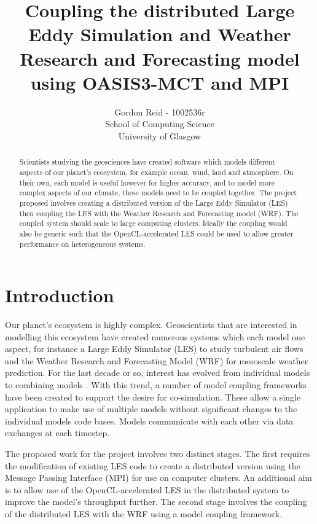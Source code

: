 \documentclass{acm_proc_article-sp}
\title{Coupling the distributed Large Eddy Simulation and Weather Research and
Forecasting model using OASIS3-MCT and MPI}
\author{Gordon Reid - 1002536r\\
        School of Computing Science\\
        University of Glasgow}
\begin{document}
\maketitle

\begin{abstract}

Scientists studying the geosciences have created software which models different
aspects of our planet's ecosystem, for example ocean, wind, land and atmosphere.
On their own, each model is useful however for higher accuracy, and to model
more complex aspects of our climate, these models need to be coupled together.
The project proposed involves creating a distributed version of the Large Eddy
Simulator (LES) then coupling the LES with the Weather Research and Forecasting
model (WRF). The coupled system should scale to large computing clusters.
Ideally the coupling would also be generic such that the OpenCL-accelerated LES
could be used to allow greater performance on heterogeneous systems.

\end{abstract}

\section*{Introduction}

Our planet's ecosystem is highly complex. Geoscientists that are interested in
modelling this ecosystem have created numerous systems which each model one
aspect, for instance a Large Eddy Simulator (LES) to study turbulent air flows
\cite{Nakayama2011,Nakayama2012} and the Weather Research and Forecasting Model
(WRF) for mesoscale weather prediction. For the last decade or so, interest has
evolved from individual models to combining models \cite{Michalakes2010}. With
this trend, a number of model coupling frameworks have been created to support
the desire for co-simulation. These allow a single application to make use of
multiple models without significant changes to the individual models code bases.
Models communicate with each other via data exchanges at each timestep.

The proposed work for the project involves two distinct stages. The first
requires the modification of existing LES code to create a distributed version
using the Message Passing Interface (MPI) for use on computer clusters. An
additional aim is to allow use of the OpenCL-accelerated LES
\cite{Vanderbauwhede2014} in the distributed system to improve the model's
throughput further. The second stage involves the coupling of the distributed
LES with the WRF using a model coupling framework.
\end{document}
